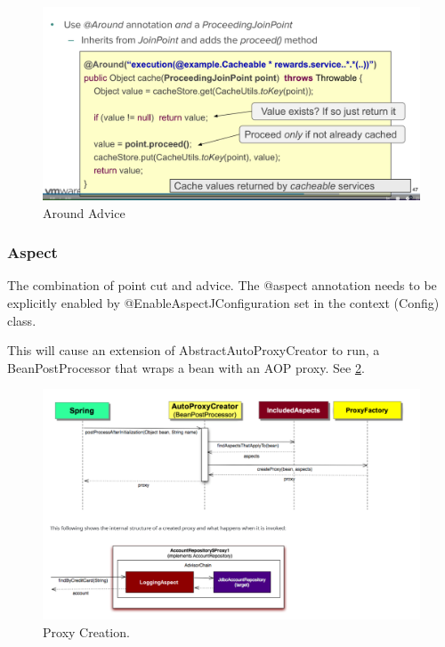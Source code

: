 \documentclass{scrartcl}
\begin{document}
\begin{itemize}
    \begin{figure}
        \centering
        \includegraphics[width=1\linewidth]{around-advice}
        \caption{Around Advice}
        \label{fig:around-advice}
    \end{figure}

\end{itemize}

\subsubsection{Aspect}

The combination of point cut and advice. The @aspect annotation needs to be explicitly enabled by @EnableAspectJConfiguration set in the context (Config) class.

This will cause an extension of AbstractAutoProxyCreator to run, a BeanPostProcessor that wraps a bean with an AOP proxy. See \ref{fig:autoproxycreator}.

\begin{figure}
    \centering
    \includegraphics[width=1\linewidth]{autoproxycreator}
    \caption{Proxy Creation.}
    \label{fig:autoproxycreator}
\end{figure}
\end{document}
